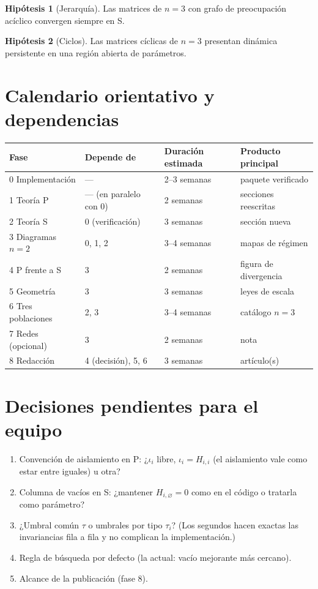 \documentclass[11pt,a4paper]{article}
\theoremstyle{plain}
\theoremstyle{definition}
\newtheorem{hipotesis}{Hipótesis}
\theoremstyle{remark}
\newcommand{\vac}{\varnothing}
\newcommand{\modP}{\textsf{P}}
\newcommand{\modS}{\textsf{S}}
\begin{document}
\begin{hipotesis}[Jerarquía]\label{hip:jerarquia}
Las matrices de $n=3$ con grafo de preocupación acíclico convergen siempre en
\modS.
\end{hipotesis}

\begin{hipotesis}[Ciclos]\label{hip:ciclo}
Las matrices cíclicas de $n=3$ presentan dinámica persistente en una región
abierta de parámetros.
\end{hipotesis}

\section{Calendario orientativo y dependencias}

\begin{center}
\begin{tabular}{@{}llll@{}}
\toprule
Fase & Depende de & Duración estimada & Producto principal \\
\midrule
0 Implementación & --- & 2--3 semanas & paquete verificado \\
1 Teoría \modP & --- (en paralelo con 0) & 2 semanas & secciones reescritas \\
2 Teoría \modS & 0 (verificación) & 3 semanas & sección nueva \\
3 Diagramas $n=2$ & 0, 1, 2 & 3--4 semanas & mapas de régimen \\
4 \modP{} frente a \modS & 3 & 2 semanas & figura de divergencia \\
5 Geometría & 3 & 3 semanas & leyes de escala \\
6 Tres poblaciones & 2, 3 & 3--4 semanas & catálogo $n=3$ \\
7 Redes (opcional) & 3 & 2 semanas & nota \\
8 Redacción & 4 (decisión), 5, 6 & 3 semanas & artículo(s) \\
\bottomrule
\end{tabular}
\end{center}

\section{Decisiones pendientes para el equipo}

\begin{enumerate}
  \item Convención de aislamiento en \modP: ¿$\iota_i$ libre, $\iota_i=H_{i,i}$
  (el aislamiento vale como estar entre iguales) u otra?
  \item Columna de vacíos en \modS: ¿mantener $H_{i,\vac}=0$ como en el código o
  tratarla como parámetro?
  \item ¿Umbral común $\tau$ o umbrales por tipo $\tau_i$? (Los segundos hacen
  exactas las invariancias fila a fila y no complican la implementación.)
  \item Regla de búsqueda por defecto (la actual: vacío mejorante más cercano).
  \item Alcance de la publicación (fase 8).
\end{enumerate}
\end{document}
